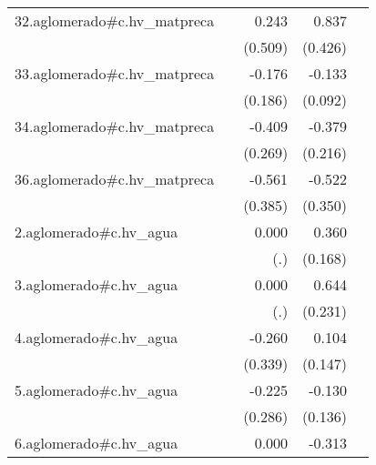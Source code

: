 {\begin{longtable}{l*{4}{D{.}{.}{-1}}}
\addlinespace
32.aglomerado#c.hv\_matpreca&                     &       0.243         &       0.837\sym{*}  &                     \\
            &                     &     (0.509)         &     (0.426)         &                     \\
\addlinespace
33.aglomerado#c.hv\_matpreca&                     &      -0.176         &      -0.133         &                     \\
            &                     &     (0.186)         &     (0.092)         &                     \\
\addlinespace
34.aglomerado#c.hv\_matpreca&                     &      -0.409         &      -0.379         &                     \\
            &                     &     (0.269)         &     (0.216)         &                     \\
\addlinespace
36.aglomerado#c.hv\_matpreca&                     &      -0.561         &      -0.522         &                     \\
            &                     &     (0.385)         &     (0.350)         &                     \\
\addlinespace
2.aglomerado#c.hv\_agua&                     &       0.000         &       0.360\sym{*}  &                     \\
            &                     &         (.)         &     (0.168)         &                     \\
\addlinespace
3.aglomerado#c.hv\_agua&                     &       0.000         &       0.644\sym{**} &                     \\
            &                     &         (.)         &     (0.231)         &                     \\
\addlinespace
4.aglomerado#c.hv\_agua&                     &      -0.260         &       0.104         &                     \\
            &                     &     (0.339)         &     (0.147)         &                     \\
\addlinespace
5.aglomerado#c.hv\_agua&                     &      -0.225         &      -0.130         &                     \\
            &                     &     (0.286)         &     (0.136)         &                     \\
\addlinespace
6.aglomerado#c.hv\_agua&                     &       0.000         &      -0.313         &                     \\

\end{longtable}}
